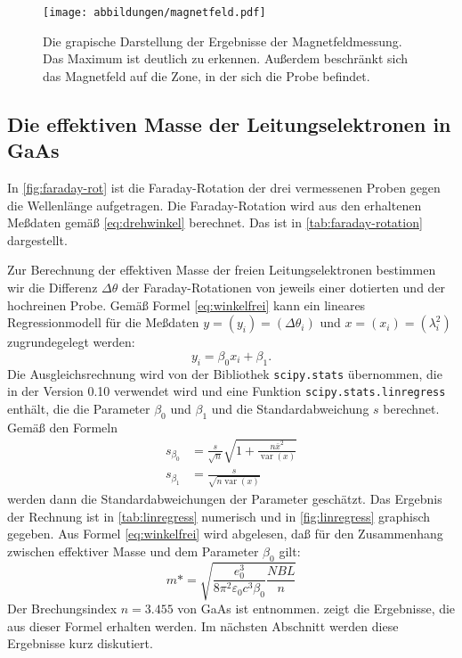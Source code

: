 \begin{figure}
  \centering
  \texttt{[image: abbildungen/magnetfeld.pdf]}
  \caption{Die grapische Darstellung der Ergebnisse der
    Magnetfeldmessung.  Das Maximum ist deutlich zu erkennen.  Außerdem
    beschränkt sich das Magnetfeld auf die Zone, in der sich die Probe
    befindet.}
  \label{fig:magnetfeld}
\end{figure}
\FloatBarrier
\subsection{Die effektiven Masse der Leitungselektronen in GaAs}

In \cref{fig:faraday-rot} ist die Faraday-Rotation der drei vermessenen
Proben gegen die Wellenlänge aufgetragen.  Die Faraday-Rotation wird aus
den erhaltenen Meßdaten gemäß \cref{eq:drehwinkel} berechnet. Das ist in
\cref{tab:faraday-rotation} dargestellt.

Zur Berechnung der effektiven Masse der freien Leitungselektronen
bestimmen wir die Differenz $\Delta\theta$ der Faraday-Rotationen von
jeweils einer dotierten und der hochreinen Probe.  Gemäß Formel
\eqref{eq:winkelfrei} kann ein lineares Regressionmodell für die
Meßdaten $y = (y_i) = (\Delta\theta_i)$ und $x = (x_i) = (\lambda_i^2)$
zugrundegelegt werden:
%
\begin{equation}
  \label{eq:linregress}
  y_i = \beta_0 x_i + \beta_1.
\end{equation}
Die Ausgleichsrechnung wird von der Bibliothek \texttt{scipy.stats}
übernommen, die in der Version 0.10 verwendet wird und eine Funktion
\texttt{scipy.stats.linregress} enthält, die die Parameter $\beta_0$ und
$\beta_1$ und die Standardabweichung $s$ berechnet.  Gemäß den Formeln
%
\begin{align}
  \label{eq:stat-formeln}
  s_{\beta_0} &= \frac{s}{\sqrt{n}} \sqrt{1 + \frac{n\bar{x}^2}
    {\operatorname{var}(x)}}\\
  s_{\beta_1} &= \frac{s}{\sqrt{n \operatorname{var}(x)}}
\end{align}
%
werden dann die Standardabweichungen der Parameter geschätzt.  Das
Ergebnis der Rechnung ist in \cref{tab:linregress} numerisch und in
\cref{fig:linregress} graphisch gegeben.  Aus Formel
\eqref{eq:winkelfrei} wird abgelesen, daß für den Zusammenhang zwischen
effektiver Masse und dem Parameter $\beta_0$ gilt:
%
\begin{equation}
m* = \sqrt{\frac{e_0^3}{8\pi^2\varepsilon_0c^3\beta_0} \frac{NBL}{n}}
\label{eq:effekt}
\end{equation}
%
Der Brechungsindex $n = \num{3.455}$ von GaAs ist \cite{filmetrics}
entnommen.  zeigt die Ergebnisse, die aus dieser
Formel erhalten werden.  Im nächsten Abschnitt werden diese Ergebnisse
kurz diskutiert.

